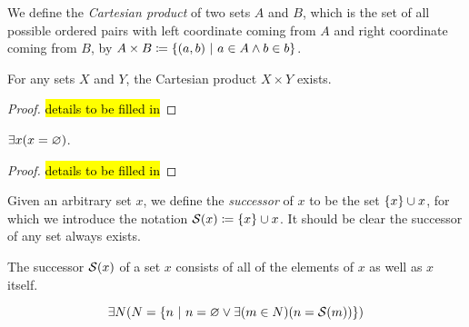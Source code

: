 \begin{definition}
    We define the \emph{Cartesian product} of two sets \(A\) and \(B\),
    which is the set of all possible ordered pairs with
    left coordinate coming from \(A\) and right coordinate coming from \(B\),
    by \(A \times B \defn \set*{(a, b) \suchthat a \in A \meet b \in b}\).
\end{definition}

\begin{theorem}
    For any sets \(X\) and \(Y\), the Cartesian product \(X \times Y\) exists.
\end{theorem}
\begin{proof}
    \hl{details to be filled in}  %
\end{proof}

\begin{theorem}
    \(\exists x \pn*{x = \emptyset}\).
\end{theorem}
\begin{proof}
    \hl{details to be filled in}  %
\end{proof}

\begin{definition}
    Given an arbitrary set \(x\), we define the \emph{successor} of \(x\) to be the set \(\set*{x} \union x\),
    for which we introduce the notation \(\successor{x} \defn \set*{x} \union x\).
    It should be clear the successor of any set always exists.

    \begin{note}
        The successor \(\successor{x}\) of a set \(x\) consists of
        all of the elements of \(x\) as well as \(x\) itself.
    \end{note}
\end{definition}

\begin{axiom}[Infinity]
    \vspace{-\abovedisplayskip}
    \[
        \exists N \pn*{N = \set*{n \suchthat n = \emptyset \join \exists\pn*{m \in N}\pn*{n = \successor{m}}}}
    \]
\end{axiom}


